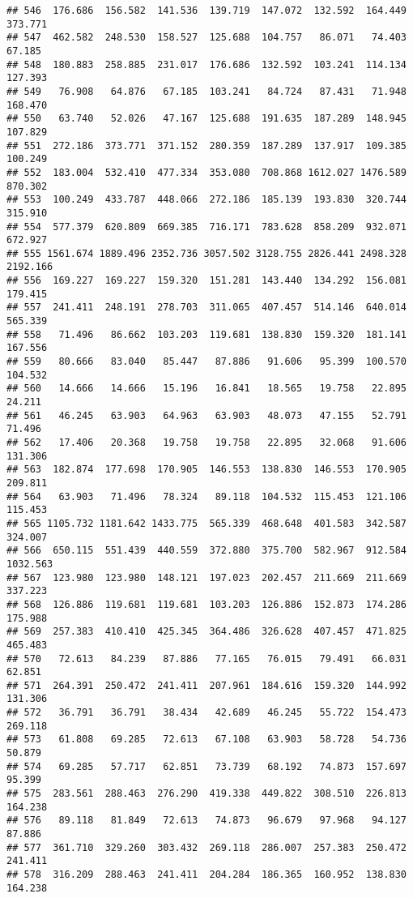 \documentclass[
]{article}
\begin{document}
\begin{verbatim}
## 546  176.686  156.582  141.536  139.719  147.072  132.592  164.449  373.771
## 547  462.582  248.530  158.527  125.688  104.757   86.071   74.403   67.185
## 548  180.883  258.885  231.017  176.686  132.592  103.241  114.134  127.393
## 549   76.908   64.876   67.185  103.241   84.724   87.431   71.948  168.470
## 550   63.740   52.026   47.167  125.688  191.635  187.289  148.945  107.829
## 551  272.186  373.771  371.152  280.359  187.289  137.917  109.385  100.249
## 552  183.004  532.410  477.334  353.080  708.868 1612.027 1476.589  870.302
## 553  100.249  433.787  448.066  272.186  185.139  193.830  320.744  315.910
## 554  577.379  620.809  669.385  716.171  783.628  858.209  932.071  672.927
## 555 1561.674 1889.496 2352.736 3057.502 3128.755 2826.441 2498.328 2192.166
## 556  169.227  169.227  159.320  151.281  143.440  134.292  156.081  179.415
## 557  241.411  248.191  278.703  311.065  407.457  514.146  640.014  565.339
## 558   71.496   86.662  103.203  119.681  138.830  159.320  181.141  167.556
## 559   80.666   83.040   85.447   87.886   91.606   95.399  100.570  104.532
## 560   14.666   14.666   15.196   16.841   18.565   19.758   22.895   24.211
## 561   46.245   63.903   64.963   63.903   48.073   47.155   52.791   71.496
## 562   17.406   20.368   19.758   19.758   22.895   32.068   91.606  131.306
## 563  182.874  177.698  170.905  146.553  138.830  146.553  170.905  209.811
## 564   63.903   71.496   78.324   89.118  104.532  115.453  121.106  115.453
## 565 1105.732 1181.642 1433.775  565.339  468.648  401.583  342.587  324.007
## 566  650.115  551.439  440.559  372.880  375.700  582.967  912.584 1032.563
## 567  123.980  123.980  148.121  197.023  202.457  211.669  211.669  337.223
## 568  126.886  119.681  119.681  103.203  126.886  152.873  174.286  175.988
## 569  257.383  410.410  425.345  364.486  326.628  407.457  471.825  465.483
## 570   72.613   84.239   87.886   77.165   76.015   79.491   66.031   62.851
## 571  264.391  250.472  241.411  207.961  184.616  159.320  144.992  131.306
## 572   36.791   36.791   38.434   42.689   46.245   55.722  154.473  269.118
## 573   61.808   69.285   72.613   67.108   63.903   58.728   54.736   50.879
## 574   69.285   57.717   62.851   73.739   68.192   74.873  157.697   95.399
## 575  283.561  288.463  276.290  419.338  449.822  308.510  226.813  164.238
## 576   89.118   81.849   72.613   74.873   96.679   97.968   94.127   87.886
## 577  361.710  329.260  303.432  269.118  286.007  257.383  250.472  241.411
## 578  316.209  288.463  241.411  204.284  186.365  160.952  138.830  164.238

\end{verbatim}
\end{document}
